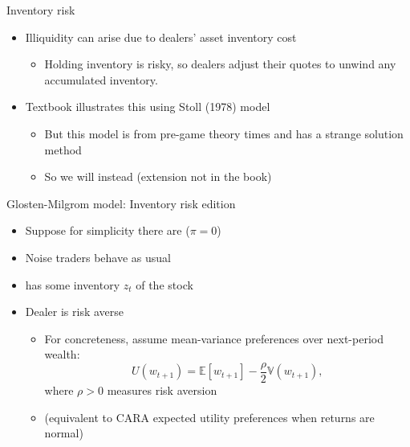 \documentclass[english,10pt
,aspectratio=169
]{beamer}
\begin{document}
\begin{frame}{Inventory risk}
	\begin{itemize}
		\item Illiquidity can arise due to dealers' asset \alert{inventory cost}
		\begin{itemize}
			\item Holding inventory is \alert{risky}, so dealers adjust their quotes to unwind any accumulated inventory.
		\end{itemize}
		\pause
		\item Textbook illustrates this using Stoll (1978) model
		\begin{itemize}
			\item But this model is from pre-game theory times and has a strange solution method
			\item So we will instead  (extension not in the book)
		\end{itemize}
	\end{itemize}
\end{frame}


\begin{frame}{Glosten-Milgrom model: Inventory risk edition}
	\begin{itemize}
		\item Suppose for simplicity there are  ($\pi=0$)
		\item Noise traders behave as usual
		\item {} has some \alert{inventory} $z_t$ of the stock
		\item Dealer is \alert{risk averse}
		\begin{itemize}
			\item For concreteness, assume mean-variance preferences over next-period wealth:
			\[
			U(w_{t+1})=\mathbb{E}[w_{t+1}] - \frac{\rho}{2} \mathbb{V}(w_{t+1}),
			\]
			where $\rho>0$ measures risk aversion
			\item (equivalent to CARA expected utility preferences when returns are normal)
		\end{itemize}
	\end{itemize}
\end{frame}
\end{document}
